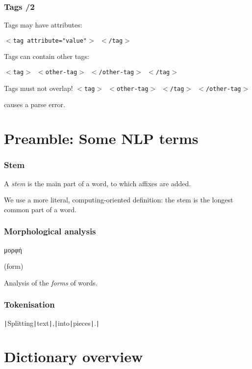 \documentclass{beamer} %
\newcommand\grktext[1]{{\fontencoding{LGR}\fontfamily{pmt}\selectfont #1}}
\begin{document}
\begin{frame}
  \frametitle{Tags /2}
  Tags may have attributes: 

  {\tt $<$tag attribute="value"$>$ $<$/tag$>$}

  Tags can contain other tags: 

  {\tt $<$tag$>$ $<$other-tag$>$ $<$/other-tag$>$ $<$/tag$>$}

  \begin{alertblock}{Tags must not overlap!}
    {\tt $<$tag$>$ $<$other-tag$>$ $<$/tag$>$ $<$/other-tag$>$}

   causes a parse error. 
  \end{alertblock}
\end{frame}

\section{Preamble: Some NLP terms}

\begin{frame}
\frametitle{Stem}
A {\it stem} is the main part of a word, to which affixes are added.

\pause

We use a more literal, computing-oriented definition: the stem is the longest
common part of a word.

\end{frame}

\begin{frame}
\frametitle{Morphological analysis}

 \begin{center}
 {\Large \grktext{μορφή}}
 \end{center}

\pause
  \begin{center}
   (form)
  \end{center}

\pause

Analysis of the {\it forms} of words.

\end{frame}

\begin{frame}
\frametitle{Tokenisation}

  \begin{center}
    {\tt |}Splitting{\tt |}text{\tt |},{\tt |}into{\tt |}pieces{\tt |}.{\tt |}
  \end{center}
\end{frame}

\section{Dictionary overview}
\end{document}
